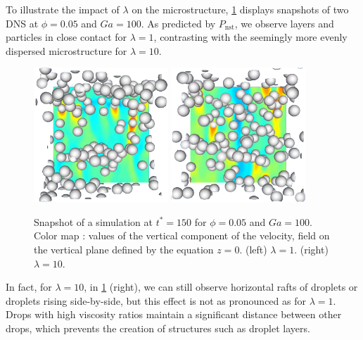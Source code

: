 To illustrate the impact of $\lambda$ on the microstructure, \ref{fig:images} displays snapshots of two DNS at $\phi = 0.05$ and $Ga = 100$. 
As predicted by $P_\text{nst}$, we observe layers and particles in close contact for $\lambda = 1$, contrasting with the seemingly more evenly dispersed microstructure for $\lambda = 10$.
\begin{figure}[h!]
   \centering
   \includegraphics[width=0.45\textwidth]{image/HOMOGENEOUS_NEW/P_PHI_5_l_10_Ga_100.png}
   \includegraphics[width=0.45\textwidth]{image/HOMOGENEOUS_NEW/P_PHI_5_l_1_Ga_100.png}
   \caption{Snapshot of a simulation at $t^* = 150$ for $\phi=0.05$ and $Ga=100$.
   Color map : values of the vertical component of the velocity, field on the vertical plane defined by the equation $z=0$. 
   (left)  $\lambda = 1$.
   (right)  $\lambda = 10$.
   }
   \label{fig:images}
\end{figure}
In fact, for $\lambda = 10$, in \ref{fig:images} (right), we can still observe horizontal rafts of droplets or droplets rising side-by-side, but this effect is not as pronounced as for $\lambda = 1$. 
Drops with high viscosity ratios maintain a significant distance between other drops, which prevents the creation of structures such as droplet layers.
